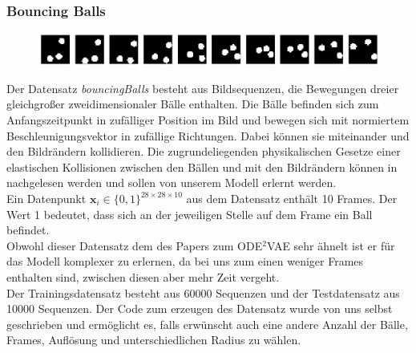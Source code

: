 \documentclass[12pt]{article}
\newcommand{\x}{\mathbf{x}_i}
\begin{document}
	\subsubsection{Bouncing Balls}
	\begin{figure}[!htbp]
		\centering
		\includegraphics[scale=0.4]{bouncingBalls}
	\end{figure}
	Der Datensatz \emph{bouncingBalls} besteht aus Bildsequenzen, die Bewegungen dreier gleichgroßer zweidimensionaler Bälle enthalten. Die Bälle befinden sich zum Anfangszeitpunkt in zufälliger Position im Bild und bewegen sich mit normiertem Beschleunigungsvektor in zufällige Richtungen. Dabei können sie miteinander und den Bildrändern kollidieren. 
	Die zugrundeliegenden physikalischen Gesetze einer elastischen Kollisionen zwischen den Bällen und mit den Bildrändern können in \cite{ElastKol} nachgelesen werden und sollen von unserem Modell erlernt werden. \\
	Ein Datenpunkt $\x\in \{0,1\}^{28\times 28\times 10}$ aus dem Datensatz enthält 10 Frames. Der Wert 1 bedeutet, dass sich an der jeweiligen 
	Stelle auf dem Frame ein Ball befindet.\\
	Obwohl dieser Datensatz dem des Papers zum ODE$^2$VAE sehr ähnelt ist er für das Modell komplexer zu erlernen, da bei uns zum einen weniger Frames enthalten sind, zwischen diesen aber mehr Zeit vergeht.\\
	Der Trainingsdatensatz besteht aus 60000 Sequenzen und der Testdatensatz aus 10000 Sequenzen. 
	Der Code zum erzeugen des Datensatz wurde von uns selbst geschrieben und ermöglicht es, falls erwünscht auch eine andere Anzahl der Bälle, Frames, Auflösung und unterschiedlichen Radius zu wählen.
\end{document}
